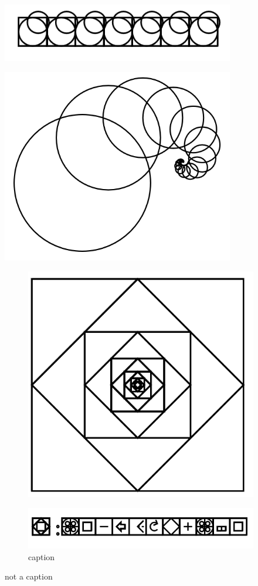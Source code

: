 \documentclass[11pt]{article}
\begin{document}
\includegraphics[width=4in]{image38.png}

\includegraphics[width=4in]{image39.png}





\begin{figure}[h]
\includegraphics[width=4in]{image40.png}

\caption{}
\end{figure}










\begin{figure}[h]
\includegraphics[width=4in]{image42.png}

\caption{
caption}
\end{figure}





not a caption
\end{document}
